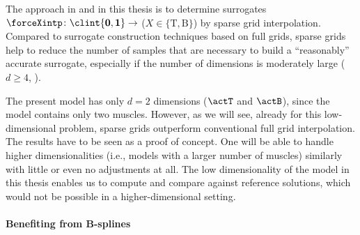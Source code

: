 The approach in \cite{Valentin18Gradient} and in this thesis is
to determine surrogates
$\forceXintp\colon \clint{\*0, \*1} \to \real$
($X \in \{\mathrm{T}, \mathrm{B}\}$) by sparse grid interpolation.
Compared to surrogate construction techniques based on full grids,
sparse grids help to reduce the number of samples that
are necessary to build a ``reasonably'' accurate surrogate,
especially if the number of dimensions is moderately large
($d \ge 4$, ).

The present model has only $d = 2$ dimensions ($\actT$ and $\actB$),
since the model contains only two muscles.
However, as we will see,
already for this low-dimensional problem,
sparse grids outperform conventional full grid interpolation.
The results have to be seen as a proof of concept.
One will be able to handle higher dimensionalities
(i.e., models with a larger number of muscles) similarly with little
or even no adjustments at all.
The low dimensionality of the model in this thesis
enables us to compute and compare against reference solutions,
which would not be possible in a higher-dimensional setting.



\paragraph{Benefiting from B-splines}

